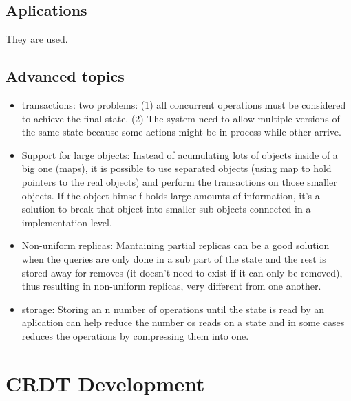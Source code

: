 \documentclass{article}
\begin{document}
\subsection{Aplications}
They are used.
\subsection{Advanced topics}
\begin{itemize}
    \item transactions: two problems: (1) all concurrent operations must be considered to achieve the final state. (2) The system need to allow multiple versions of the same state because some actions might be in process while other arrive.
    \item  Support for large objects: Instead of acumulating lots of objects inside of a big one (maps), it is possible to use separated objects (using map to hold pointers to the real objects) and perform the transactions on those smaller objects. If the object himself holds large amounts of information, it's a solution to break that object into smaller sub objects connected in a implementation level.
    \item Non-uniform replicas: Mantaining partial replicas can be a good solution when the queries are only done in a sub part of the state and the rest is stored away for removes (it doesn't need to exist if it can only be removed), thus resulting in non-uniform replicas, very different from one another.
    \item storage: Storing an n number of operations until the state is read by an aplication can help reduce the number os reads on a state and in some cases reduces the operations by compressing them into one.
\end{itemize}
\section{CRDT Development}
\end{document}
